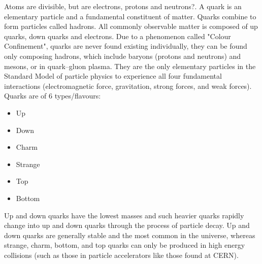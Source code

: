 \begin{phybox}{}
{Atoms are divisible, but are electrons, protons and neutrons?. A {quark} is an elementary particle and a fundamental constituent of matter. Quarks combine to form particles called hadrons. All commonly observable matter is composed of {up quarks, down quarks and electrons}. Due to a phenomenon called "Colour Confinement", quarks are never found existing individually, they can be found only composing {hadrons}, which include {baryons} (protons and neutrons) and {mesons}, or in {quark–gluon plasma}. They are the only elementary particles in the Standard Model of particle physics to experience all four fundamental interactions (electromagnetic force, gravitation, strong forces, and weak forces).\\
Quarks are of 6 types/flavours:
\begin{itemize}
\vspace{-0.5em}
    \item{Up}
\vspace{-0.5em}
    \item{Down}
\vspace{-0.5em}
    \item{Charm}
\vspace{-0.5em}
    \item{Strange}
\vspace{-0.5em}
    \item{Top}
\vspace{-0.5em}
    \item{Bottom}
\vspace{-0.5em}
\end{itemize}
Up and down quarks have the lowest masses and such heavier quarks rapidly change into up and down quarks through the process of particle decay. Up and down quarks are generally stable and the most common in the universe, whereas strange, charm, bottom, and top quarks can only be produced in high energy collisions (such as those in particle accelerators like those found at CERN).}
\end{phybox}
